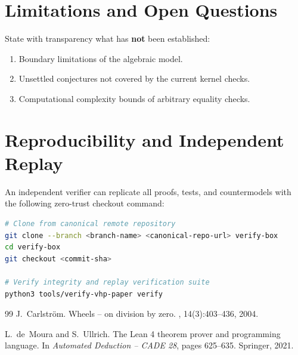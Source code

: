 \documentclass[11pt,a4paper]{article}
\theoremstyle{plain}
\theoremstyle{definition}
\theoremstyle{remark}
\begin{document}
\section{Limitations and Open Questions}
\label{sec:limitations}

State with transparency what has \textbf{not} been established:
\begin{enumerate}
    \item Boundary limitations of the algebraic model.
    \item Unsettled conjectures not covered by the current kernel checks.
    \item Computational complexity bounds of arbitrary equality checks.
\end{enumerate}

\section{Reproducibility and Independent Replay}
\label{sec:reproducibility}

An independent verifier can replicate all proofs, tests, and countermodels with the following zero-trust checkout command:

\begin{lstlisting}[language=bash,basicstyle=\ttfamily\small,breaklines=true,frame=single]
# Clone from canonical remote repository
git clone --branch <branch-name> <canonical-repo-url> verify-box
cd verify-box
git checkout <commit-sha>

# Verify integrity and replay verification suite
python3 tools/verify-vhp-paper verify
\end{lstlisting}


\begin{thebibliography}{99}
J.~Carlstr{\"o}m.
\newblock Wheels -- on division by zero.
, 14(3):403--436, 2004.

L.~de~Moura and S.~Ullrich.
\newblock The {L}ean 4 theorem prover and programming language.
\newblock In {\em Automated Deduction -- CADE 28}, pages 625--635. Springer, 2021.
\end{thebibliography}
\end{document}
